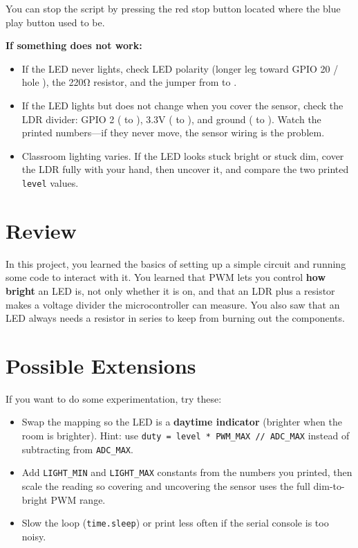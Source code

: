 You can stop the script by pressing the red stop button located where the blue play button used to be.

\begin{tcolorbox}[colback=yellow!10!white,colframe=yellow!50!black]
    \textbf{If something does not work:}
    \begin{itemize}
        \item If the LED never lights, check LED polarity (longer leg toward GPIO 20 / hole
        ), the
        220\si{\ohm} resistor, and the jumper from  to .
        \item If the LED lights but does not change when you cover the sensor, check the LDR divider:
        GPIO 2 ( to ), 3.3V
        ( to ), and ground
        ( to ). Watch the printed
        numbers---if they never move, the sensor wiring is the problem.
        \item Classroom lighting varies. If the LED looks stuck bright or stuck dim, cover the LDR fully
        with your hand, then uncover it, and compare the two printed \texttt{level} values.
    \end{itemize}
\end{tcolorbox}

\section{Review}
In this project, you learned the basics of setting up a simple circuit and running some code to interact
with it. You learned that PWM lets you control \textbf{how bright} an LED is, not only whether it is on,
and that an LDR plus a resistor makes a voltage divider the microcontroller can measure. You also saw that
an LED always needs a resistor in series to keep from burning out the components.

\section{Possible Extensions}
If you want to do some experimentation, try these:

\begin{itemize}
    \item Swap the mapping so the LED is a \textbf{daytime indicator} (brighter when the room is brighter).
    Hint: use \texttt{duty = level * PWM\_MAX // ADC\_MAX} instead of subtracting from \texttt{ADC\_MAX}.
    \item Add \texttt{LIGHT\_MIN} and \texttt{LIGHT\_MAX} constants from the numbers you printed, then
    scale the reading so covering and uncovering the sensor uses the full dim-to-bright PWM range.
    \item Slow the loop (\texttt{time.sleep}) or print less often if the serial console is too noisy.
\end{itemize}
